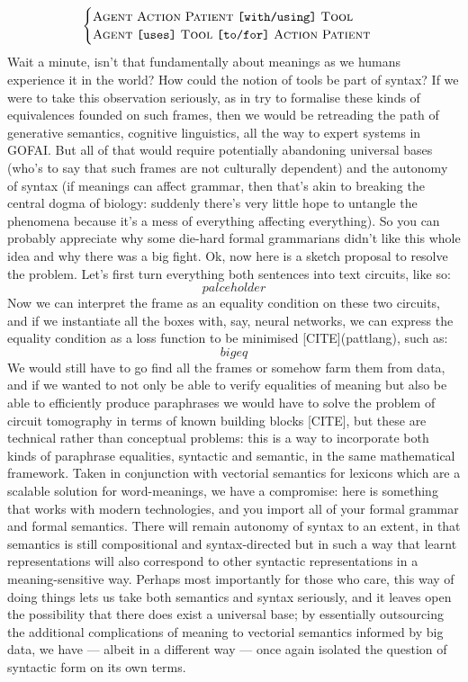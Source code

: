 \[\begin{cases}
\textsc{Agent} \ \textsc{Action} \ \textsc{Patient} \ \texttt{[with/using]} \ \textsc{Tool}\\ \textsc{Agent} \ \texttt{[uses]} \ \textsc{Tool} \ \texttt{[to/for]} \ \textsc{Action} \ \textsc{Patient}
\end{cases}\]
Wait a minute, isn't that fundamentally about meanings as we humans experience it in the world? How could the notion of tools be part of syntax? If we were to take this observation seriously, as in try to formalise these kinds of equivalences founded on such frames, then we would be retreading the path of generative semantics, cognitive linguistics, all the way to expert systems in GOFAI. But all of that would require potentially abandoning universal bases (who's to say that such frames are not culturally dependent) and the autonomy of syntax (if meanings can affect grammar, then that's akin to breaking the central dogma of biology: suddenly there's very little hope to untangle the phenomena because it's a mess of everything affecting everything). So you can probably appreciate why some die-hard formal grammarians didn't like this whole idea and why there was a big fight. Ok, now here is a sketch proposal to resolve the problem. Let's first turn everything both sentences into text circuits, like so:
\[palceholder\]
Now we can interpret the frame as an equality condition on these two circuits, and if we instantiate all the boxes with, say, neural networks, we can express the equality condition as a loss function to be minimised [CITE](pattlang), such as:
\[bigeq\]
We would still have to go find all the frames or somehow farm them from data, and if we wanted to not only be able to verify equalities of meaning but also be able to efficiently produce paraphrases we would have to solve the problem of circuit tomography in terms of known building blocks [CITE], but these are technical rather than conceptual problems: this is a way to incorporate both kinds of paraphrase equalities, syntactic and semantic, in the same mathematical framework. Taken in conjunction with vectorial semantics for lexicons which are a scalable solution for word-meanings, we have a compromise: here is something that works with modern technologies, and you import all of your formal grammar and formal semantics. There will remain autonomy of syntax to an extent, in that semantics is still compositional and syntax-directed but in such a way that learnt representations will also correspond to other syntactic representations in a meaning-sensitive way. Perhaps most importantly for those who care, this way of doing things lets us take both semantics and syntax seriously, and it leaves open the possibility that there does exist a universal base; by essentially outsourcing the additional complications of meaning to vectorial semantics informed by big data, we have --- albeit in a different way --- once again isolated the question of syntactic form on its own terms.

